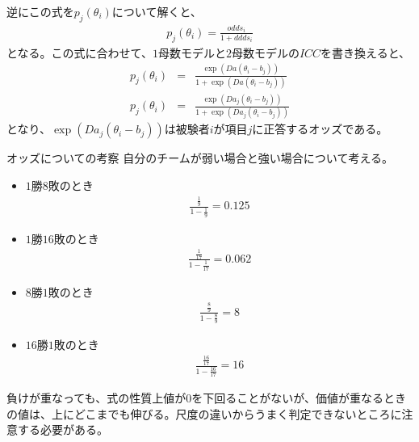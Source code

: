 \documentclass[12pt]{jarticle}
\begin{document}
逆にこの式を$p_j(\theta_i)$について解くと、
\begin{eqnarray}
  \label{01}
  \displaystyle  p_j(\theta_i) = \frac{odds_i}{1 + ddds_i}
\end{eqnarray}
となる。この式に合わせて、$1$母数モデルと$2$母数モデルの$ICC$を書き換えると、
\begin{eqnarray}
  \label{02}
  \displaystyle  p_j(\theta_i) &=& \frac{\exp(Da(\theta_i - b_j))}{1 + \exp(Da(\theta_i - b_j))} \\
  p_j(\theta_i) &=& \frac{\exp(Da_j(\theta_i - b_j))}{1 + \exp(Da_j(\theta_i - b_j))}
\end{eqnarray}
となり、$\exp(Da_j(\theta_i - b_j))$は被験者$i$が項目$j$に正答するオッズである。
\begin{itembox}[l]{オッズについての考察}
  自分のチームが弱い場合と強い場合について考える。
  \begin{itemize}
  \item $1$勝$8$敗のとき
  \begin{eqnarray}
    \label{03}
    \displaystyle \frac{\frac{1}{9}}{1 - \frac{1}{9}} = 0.125
  \end{eqnarray}
  \item $1$勝$16$敗のとき
  \begin{eqnarray}
    \label{04}
    \displaystyle \frac{\frac{1}{17}}{1 - \frac{1}{17}} = 0.062
  \end{eqnarray}
  \item $8$勝$1$敗のとき
  \begin{eqnarray}
    \label{05}
    \displaystyle \frac{\frac{8}{9}}{1 - \frac{8}{9}} = 8
  \end{eqnarray}
  \item $16$勝$1$敗のとき
  \begin{eqnarray}
    \label{06}
    \displaystyle \frac{\frac{16}{17}}{1 - \frac{16}{17}} = 16
  \end{eqnarray}
\end{itemize}
負けが重なっても、式の性質上値が$0$を下回ることがないが、価値が重なるときの値は、上にどこまでも伸びる。尺度の違いからうまく判定できないところに注意する必要がある。
\end{itembox}
\end{document}
